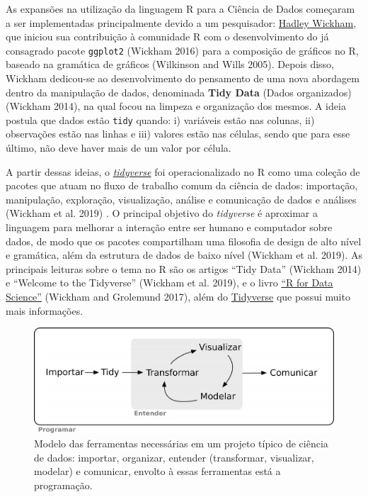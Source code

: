 \documentclass[
]{article}
\begin{document}
As expansões na utilização da linguagem R para a Ciência de Dados começaram a ser implementadas principalmente devido a um pesquisador: \href{http://hadley.nz/}{Hadley Wickham}, que iniciou sua contribuição à comunidade R com o desenvolvimento do já consagrado pacote \texttt{ggplot2} (Wickham 2016) para a composição de gráficos no R, baseado na gramática de gráficos (Wilkinson and Wills 2005). Depois disso, Wickham dedicou-se ao desenvolvimento do pensamento de uma nova abordagem dentro da manipulação de dados, denominada \textbf{Tidy Data} (Dados organizados) (Wickham 2014), na qual focou na limpeza e organização dos mesmos. A ideia postula que dados estão \texttt{tidy} quando: i) variáveis estão nas colunas, ii) observações estão nas linhas e iii) valores estão nas células, sendo que para esse último, não deve haver mais de um valor por célula.

A partir dessas ideias, o \href{https://www.tidyverse.org/}{\emph{tidyverse}} foi operacionalizado no R como uma coleção de pacotes que atuam no fluxo de trabalho comum da ciência de dados: importação, manipulação, exploração, visualização, análise e comunicação de dados e análises (Wickham et al. 2019) . O principal objetivo do \emph{tidyverse} é aproximar a linguagem para melhorar a interação entre ser humano e computador sobre dados, de modo que os pacotes compartilham uma filosofia de design de alto nível e gramática, além da estrutura de dados de baixo nível (Wickham et al. 2019). As principais leituras sobre o tema no R são os artigos ``Tidy Data'' (Wickham 2014) e ``Welcome to the Tidyverse'' (Wickham et al. 2019), e o livro \href{https://r4ds.had.co.nz/}{``R for Data Science''} (Wickham and Grolemund 2017), além do \href{https://www.tidyverse.org/}{Tidyverse} que possui muito mais informações.

\begin{figure}

{\centering \includegraphics[width=0.75\linewidth,height=0.75\textheight]{figures/cap05_fig01} 

}

\caption{Modelo das ferramentas necessárias em um projeto típico de ciência de dados: importar, organizar, entender (transformar, visualizar, modelar) e comunicar, envolto à essas ferramentas está a programação.}\label{fig:fig-r-tidyverse}
\end{figure}
\end{document}

